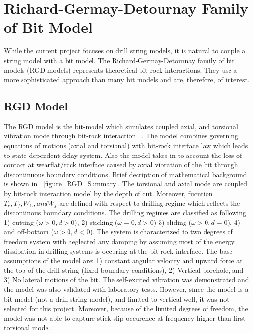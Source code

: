 \section{Richard-Germay-Detournay Family of Bit Model}
\label{ch:rgdmodels}
While the current project focuses on drill string models, it is natural to couple a string model with a bit model. The Richard-Germay-Detournay family of bit models (RGD models) represents theoretical bit-rock interactions.  They use a more sophisticated approach than many bit models and are, therefore, of interest.

\subsection{RGD Model}
The RGD model is the bit-model which simulates coupled axial, and torsional vibration mode through bit-rock interaction ~\cite{ref:richard2007a}. The model combines governing equations of motions (axial and torsional) with bit-rock interface law which leads to state-dependent delay system. Also the model takes in to account the loss of contact at wearflat/rock interface caused by axial vibration of the bit through discontinuous boundary conditions. Brief decription of mathematical background is shown in \figurename~\ref{figure_RGD_Summary}. The torsional and axial mode are coupled by bit-rock interaction model by the depth of cut. Moreover, fucntion $T_c, T_f, W_C, and W_f$ are defined with respect to drilling regime which reflects the discontinous boundary conditions. The drilling regimes are classified as following 1) cutting ($\omega>0, d>0$), 2) sticking ($\omega=0, d>0$) 3) sliding ($\omega>0, d=0$), 4) and off-bottom ($\omega>0, d<0$). The system is characterized to two degrees of freedom system with neglected any damping by assuming most of the energy dissipation in drilling systems is occuring at the bit-rock interface. The base assumptions of the model are: 1) constant angular velocity and upward force at the top of the drill string (fixed boundary conditions), 2) Vertical borehole, and 3) No lateral motions of the bit. The self-excited vibration was demonstrated and the model was also validated with laboratory tests. However, since the model is a bit model (not a drill string model), and limited to vertical well, it was not selected for this project. Moreover, because of the limited degrees of freedom, the model was not able to capture stick-slip occurence at frequency higher than first torsional mode. 

